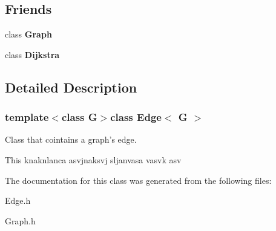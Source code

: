 \subsection*{\-Friends}
\begin{DoxyCompactItemize}
\item 
\hypertarget{classEdge_afab89afd724f1b07b1aaad6bdc61c47a}{class {\bfseries \-Graph}}\label{classEdge_afab89afd724f1b07b1aaad6bdc61c47a}

\item 
\hypertarget{classEdge_a2c018eee3a26b9115c8075f389b717ad}{class {\bfseries \-Dijkstra}}\label{classEdge_a2c018eee3a26b9115c8075f389b717ad}

\end{DoxyCompactItemize}


\subsection{\-Detailed \-Description}
\subsubsection*{template$<$class G$>$class Edge$<$ G $>$}

\-Class that cointains a graph's edge. 

\-This knaknlanca asvjnaksvj sljanvasa vasvk asv 

\-The documentation for this class was generated from the following files\-:\begin{DoxyCompactItemize}
\item 
\-Edge.\-h\item 
\-Graph.\-h\end{DoxyCompactItemize}
